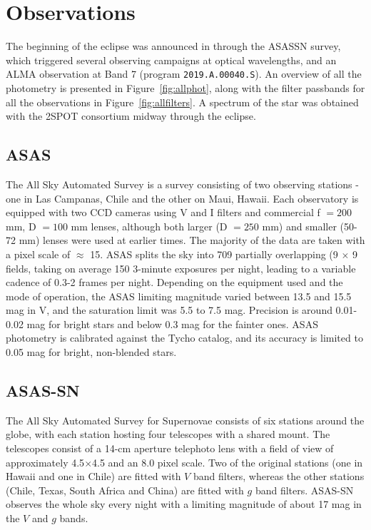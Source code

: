 \documentclass{aa}
\begin{document}
\section{Observations}\label{sec:obs}

The beginning of the eclipse was announced in \citet{RizzoSmith21} through the ASASSN survey, which triggered several observing campaigns at optical wavelengths, and an ALMA observation at Band 7 (program \texttt{2019.A.00040.S}).
%
An overview of all the photometry is presented in Figure~\ref{fig:allphot}, along with the filter passbands for all the observations in Figure~\ref{fig:allfilters}.
%
A spectrum of the star was obtained with the 2SPOT consortium midway through the eclipse.

\subsection{ASAS}

The All Sky Automated Survey \citep[ASAS; ][]{pojmanski_all_1997, asas_2005, asas_2018} is a survey consisting of two observing stations - one in Las Campanas, Chile and the other on Maui, Hawaii. 
%
Each observatory is equipped with two CCD cameras using V and I filters and commercial f $ = 200$ mm, D $= 100$ mm lenses, although both larger (D $=250$ mm) and smaller (50-72 mm) lenses were used at earlier times.
%
The majority of the data are taken with a pixel scale of $\approx$ 15\arcsec{}.
%
ASAS splits the sky into 709 partially overlapping (9\degr{} $\times$ 9\degr{} fields, taking on average 150 3-minute exposures per night, leading to a variable cadence of 0.3-2 frames per night.
%
Depending on the equipment used and the mode of operation, the ASAS limiting magnitude varied between 13.5 and 15.5 mag in V, and the saturation limit was 5.5 to 7.5 mag. 
%
Precision is around 0.01-0.02 mag for bright stars and below 0.3 mag for the fainter ones. 
%
ASAS photometry is calibrated against the Tycho catalog, and its accuracy is limited to 0.05 mag for bright, non-blended stars.

\subsection{ASAS-SN}

The All Sky Automated Survey for Supernovae \citep[ASAS-SN; ][]{shappee_man_2014,kochanek_all-sky_2017} consists of six stations around the globe, with each station hosting four telescopes with a shared mount.
%
The telescopes consist of a 14-cm aperture telephoto lens with a field of view of approximately 4.5\degr{}$\times$4.5\degr{} and an 8.0\arcsec{} pixel scale.
% 
Two of the original stations (one in Hawaii and one in Chile) are fitted with $V$ band filters, whereas the other stations (Chile, Texas, South Africa and China) are fitted with $g$ band filters.
%
ASAS-SN observes the whole sky every night with a limiting magnitude of about 17 mag in the $V$ and $g$ bands.
%
\end{document}
